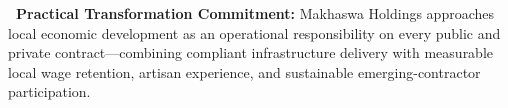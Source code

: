 \documentclass[a4paper,11pt]{article}
\providecommand{\faHandsHelping}{\faHands*}
\providecommand{\faHandshake}{\faHandsHelping}
\begin{document}
\vfill

\noindent
\begin{tcolorbox}[
    enhanced, colback=mhoffwhite, colframe=mhnavy, boxrule=0.9pt, arc=4pt,
    left=10pt, right=10pt, top=7pt, bottom=7pt,
    borderline west={3.5pt}{0pt}{mhgold}, drop shadow=black!4
]
    {\fontsize{8.5pt}{12.0pt}\selectfont\color{mhtext}
    \textbf{\color{mhnavy}\faHandshake\ Practical Transformation Commitment:} Makhaswa Holdings approaches local economic development as an operational responsibility on every public and private contract---combining compliant infrastructure delivery with measurable local wage retention, artisan experience, and sustainable emerging-contractor participation.
    }
\end{tcolorbox}

\clearpage

\thispagestyle{empty}
\hypertarget{sec:tenderpack}{}
\end{document}
